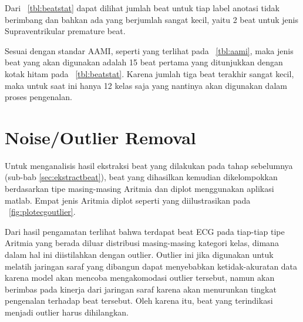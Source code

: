 Dari \tab~\ref{tbl:beatstat} dapat dilihat jumlah beat untuk tiap label anotasi
tidak berimbang dan bahkan ada yang berjumlah sangat kecil, yaitu 2 beat untuk
jenis Supraventrikular premature beat. 


Sesuai dengan standar AAMI, seperti yang terlihat pada \tab~\ref{tbl:aami}, maka
jenis beat yang akan digunakan adalah 15 beat pertama yang ditunjukkan dengan
kotak hitam pada \tab~\ref{tbl:beatstat}. Karena jumlah tiga beat terakhir
sangat kecil, maka untuk saat ini hanya 12 kelas saja yang nantinya akan digunakan
dalam proses pengenalan. 



\section{Noise/Outlier Removal}
Untuk menganalisis hasil ekstraksi beat yang dilakukan pada tahap sebelumnya
(sub-bab \ref{sec:ekstractbeat}), beat yang dihasilkan kemudian dikelompokkan
berdasarkan tipe masing-masing Aritmia dan diplot menggunakan aplikasi matlab.
Empat jenis Aritmia diplot seperti yang diilustrasikan pada
\pic~\ref{fig:plotecgoutlier}.


Dari hasil pengamatan terlihat bahwa terdapat beat ECG pada tiap-tiap tipe
Aritmia yang berada diluar distribusi masing-masing kategori kelas, dimana
dalam hal ini diistilahkan dengan outlier. Outlier ini jika digunakan untuk
melatih jaringan saraf yang dibangun dapat menyebabkan ketidak-akuratan data
karena model akan mencoba mengakomodasi outlier tersebut, namun akan berimbas
pada kinerja dari jaringan saraf karena akan menurunkan tingkat pengenalan
terhadap beat tersebut. Oleh karena itu, beat yang terindikasi menjadi outlier
harus dihilangkan.

